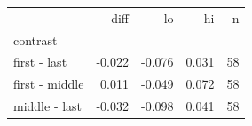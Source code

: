 \begin{tabular}{lrrrr}
\toprule
 & diff & lo & hi & n \\
contrast &  &  &  &  \\
\midrule
first - last & -0.022 & -0.076 & 0.031 & 58 \\
first - middle & 0.011 & -0.049 & 0.072 & 58 \\
middle - last & -0.032 & -0.098 & 0.041 & 58 \\
\bottomrule
\end{tabular}
